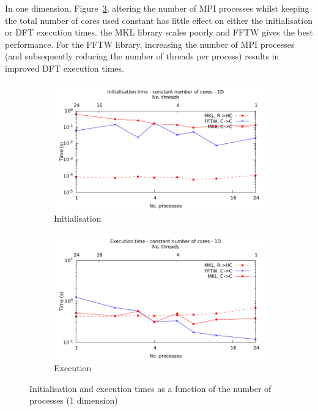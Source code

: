 \documentclass[12pt, a4paper]{article} \setlength{\textheight}{24cm}
\begin{document}
In one dimension, Figure~\ref{1DCONST}, altering the number of MPI
processes whilst keeping the total number of cores used constant has
little effect on either the initialisation or DFT execution times. the
MKL library scales poorly and FFTW gives the best performance. For the
FFTW library, increasing the number of MPI processes (and subsequently
reducing the number of threads per process) results in improved DFT
execution times.




\begin{figure}[H]
  \centering
  \begin{subfigure}{.5\textwidth}
    \centering
    \includegraphics[width=.9\linewidth]{graphs/const-init-1d.pdf}
    \caption{Initialisation}
    \label{1DCONSTI}
  \end{subfigure}%
  \begin{subfigure}{.5\textwidth}
    \centering
    \includegraphics[width=.9\linewidth]{graphs/const-exec-1d.pdf}
    \caption{Execution}
    \label{1DCONSTE}
  \end{subfigure}
  \caption{Initialisation and execution times as a function of the
    number of processes (1 dimension)}
  \label{1DCONST}
\end{figure}
\end{document}
